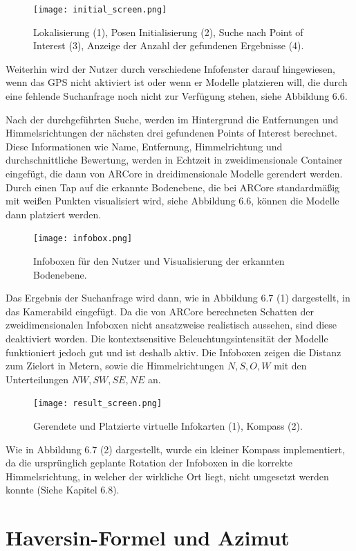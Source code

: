 \begin{figure}[H]
	\centering
	\texttt{[image: initial\_screen.png]}
	\caption{Lokalisierung (1), Posen Initialisierung (2),  Suche nach Point of Interest (3), Anzeige der Anzahl der gefundenen Ergebnisse (4).}
\end{figure} 

Weiterhin wird der Nutzer durch verschiedene Infofenster darauf hingewiesen, wenn das GPS nicht aktiviert ist oder wenn er Modelle platzieren will, die durch eine fehlende Suchanfrage noch nicht zur Verfügung stehen, siehe Abbildung 6.6. 

Nach der durchgeführten Suche, werden im Hintergrund die Entfernungen und Himmelsrichtungen der nächsten drei gefundenen Points of Interest berechnet. Diese Informationen wie Name, Entfernung, Himmelrichtung und durchschnittliche Bewertung, werden in Echtzeit in zweidimensionale Container eingefügt, die dann von ARCore in dreidimensionale Modelle gerendert werden. Durch einen Tap auf die erkannte Bodenebene, die bei ARCore standardmäßig mit weißen Punkten visualisiert wird, siehe Abbildung 6.6, können die Modelle dann platziert werden.

\begin{figure}[H]
	\centering
	\texttt{[image: infobox.png]}
	\caption{Infoboxen für den Nutzer und Visualisierung der erkannten Bodenebene.}
\end{figure} 

Das Ergebnis der Suchanfrage wird dann, wie in Abbildung 6.7 (1) dargestellt, in das Kamerabild eingefügt. Da die von ARCore berechneten Schatten der zweidimensionalen Infoboxen nicht ansatzweise realistisch aussehen, sind diese deaktiviert worden. Die kontextsensitive Beleuchtungsintensität der Modelle funktioniert jedoch gut und ist deshalb aktiv. Die Infoboxen zeigen die Distanz zum Zielort in Metern, sowie die Himmelrichtungen $N, S, O, W$ mit den Unterteilungen $NW, SW, SE, NE$ an. 

\begin{figure}[H]
	\centering
	\texttt{[image: result\_screen.png]}
	\caption{Gerendete und Platzierte virtuelle Infokarten (1), Kompass (2).}
\end{figure} 

Wie in Abbildung 6.7 (2) dargestellt, wurde ein kleiner Kompass implementiert, da die ursprünglich geplante Rotation der Infoboxen in die korrekte Himmelsrichtung, in welcher der wirkliche Ort liegt, nicht umgesetzt werden konnte (Siehe Kapitel 6.8). 


\section{Haversin-Formel und Azimut}

